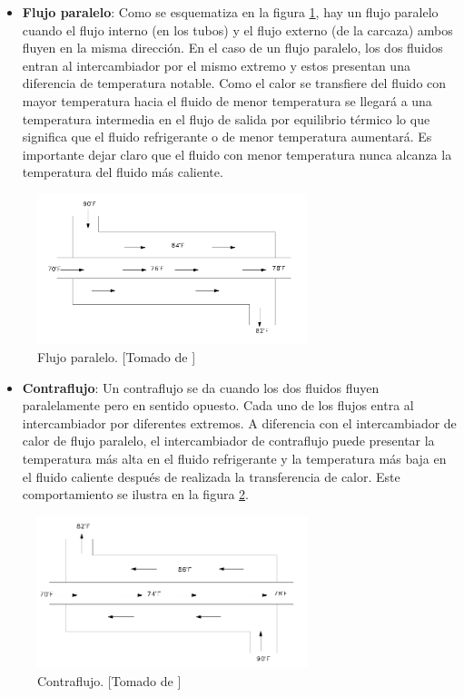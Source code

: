 \documentclass[12pt,letterpaper]{article}     %
\begin{document}
\begin{itemize}
\item \textbf{Flujo paralelo}: Como se esquematiza en la figura \ref{fig:paralelo}, hay un flujo paralelo cuando el flujo interno (en los tubos) y el flujo externo (de la carcaza) ambos fluyen en la misma dirección. En el caso de un flujo paralelo, los dos fluidos entran al intercambiador por el mismo extremo y estos presentan una diferencia de temperatura notable. Como el calor se transfiere del fluido con mayor temperatura hacia el fluido de menor temperatura se llegará a una temperatura intermedia en el flujo de salida por equilibrio térmico lo que significa que el fluido refrigerante o de menor temperatura aumentará. Es importante dejar claro que el fluido con menor temperatura nunca alcanza la temperatura del fluido más caliente.
\end{itemize}

\begin{figure}[H]
\centering
\includegraphics[width=0.7\textwidth]{paralelo.PNG}
\caption{Flujo paralelo. [Tomado de \cite{Jaramillo}]}
\label{fig:paralelo}
\end{figure}

\begin{itemize}
\item \textbf{Contraflujo}: Un contraflujo se da cuando los dos fluidos fluyen paralelamente pero en sentido opuesto. Cada uno de los flujos entra al intercambiador por diferentes extremos. A diferencia con el intercambiador de calor de flujo paralelo, el intercambiador de contraflujo puede presentar la temperatura más alta en el fluido refrigerante y la temperatura más baja en el fluido caliente después de realizada la transferencia de calor. Este comportamiento se ilustra en la figura \ref{fig:contraflujo}.
\end{itemize}

\begin{figure}[H]
\centering
\includegraphics[width=0.7\textwidth]{contraflujo.png}
\caption{Contraflujo. [Tomado de \cite{Jaramillo}]}
\label{fig:contraflujo}
\end{figure}
\end{document}

